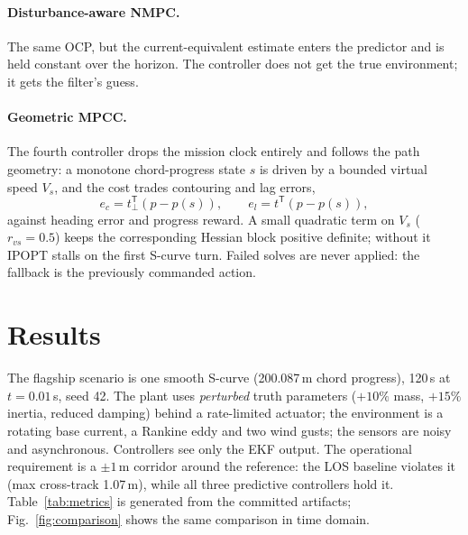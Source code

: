 \documentclass[10pt]{article}
\begin{document}
\paragraph{Disturbance-aware NMPC.}
The same OCP, but the current-equivalent estimate enters the predictor and
is held constant over the horizon. The controller does not get the true
environment; it gets the filter's guess.

\paragraph{Geometric MPCC.}
The fourth controller drops the mission clock entirely and follows the
path geometry: a monotone chord-progress state $s$ is driven by a bounded
virtual speed $V_s$, and the cost trades contouring and lag errors,
\begin{equation}
  e_c = t_\perp^\mathsf{T}(p - p(s)), \qquad
  e_l = t^\mathsf{T}(p - p(s)),
\end{equation}
against heading error and progress reward. A small quadratic term on
$V_s$ ($r_{vs}=0.5$) keeps the corresponding Hessian block positive
definite; without it IPOPT stalls on the first S-curve turn. Failed solves
are never applied: the fallback is the previously commanded action.

\section{Results}
\label{sec:results}
The flagship scenario is one smooth S-curve (200.087\,m chord progress),
120\,s at $t=0.01$\,s, seed 42. The plant uses \emph{perturbed} truth
parameters ($+10\%$ mass, $+15\%$ inertia, reduced damping) behind a
rate-limited actuator; the environment is a rotating base current, a
Rankine eddy and two wind gusts; the sensors are noisy and asynchronous.
Controllers see only the EKF output. The operational requirement is a
$\pm 1$\,m corridor around the reference: the LOS baseline violates it
(max cross-track 1.07\,m), while all three predictive controllers hold
it. Table~\ref{tab:metrics} is generated from the committed artifacts;
Fig.~\ref{fig:comparison} shows the same comparison in time domain.
\end{document}
